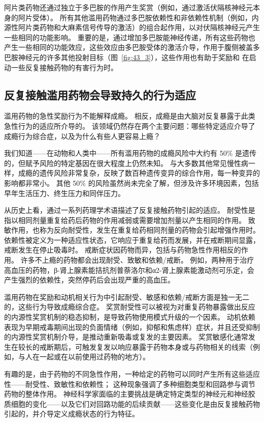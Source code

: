 阿片类药物还通过独立于多巴胺的作用产生奖赏（例如，通过激活伏隔核神经元本身的阿片受体）。
所有其他滥用药物通过多巴胺依赖性和非依赖性机制（例如，内源性阿片类药物和大麻素信号传导的激活）的组合起作用，以对伏隔核神经元产生一些相同的功能影响。
重要的是，通过增加多巴胺能神经传递，所有这些药物也产生一些相同的功能效应，这些效应由多巴胺受体的激活介导，作用于腹侧被盖多巴胺神经元的许多其他投射目标（图~\ref{fig:43_3}），这些作用也有助于奖励和 在启动一些反复接触药物的有害行为时。



\subsection{反复接触滥用药物会导致持久的行为适应}

滥用药物的急性奖励行为不能解释成瘾。
相反，成瘾是由大脑对反复暴露于此类急性行为的适应所介导的。
该领域仍然存在两个主要问题：哪些特定适应介导了成瘾行为综合症，以及为什么有些人更容易上瘾？


我们知道——在动物和人类中——所有滥用药物的成瘾风险中大约有 50\% 是遗传的，但赋予风险的特定基因在很大程度上仍然未知。
与大多数其他常见慢性病一样，成瘾的遗传风险非常复杂，反映了数百种遗传变异的综合作用，每一种变异的影响都非常小。
其他 50\% 的风险虽然尚未完全了解，但涉及许多环境因素，包括早年生活压力、终生压力和同伴压力。


从历史上看，通过一系列药理学术语描述了反复接触药物引起的适应。
耐受性是指以相同剂量重复给药后药物的作用减弱或需要增加剂量以产生相同的作用。
致敏作用，也称为反向耐受性，发生在重复给药相同剂量的药物会引起增强作用时。
依赖性被定义为一种适应性状态，它响应于重复给药而发展，并在戒断期间显露，戒断发生在停止吸毒时。
戒断症状因药物而异，包括与药物急性作用相反的作用。
许多不上瘾的药物都会出现耐受、致敏和依赖/戒断。
例如，两种用于治疗高血压的药物，β-肾上腺素能拮抗剂普萘洛尔和α2-肾上腺素能激动剂可乐定，会产生强烈的依赖性，突然停药后会出现严重的高血压。


滥用药物在奖励和动机相关行为中引起耐受、敏感和依赖/戒断方面是独一无二的，这些行为导致成瘾综合症。
奖赏耐受性可以被视为对重复药物暴露做出反应的内源性奖赏机制的稳态抑制，是导致药物使用模式升级的一个因素。
动机依赖表现为早期戒毒期间出现的负面情绪（例如，抑郁和焦虑样）症状，并且还受抑制的内源性奖赏机制介导，是推动重新吸毒或复发的主要因素。
奖赏敏感化通常发生在较长的戒断期后，可触发复发以响应暴露于药物本身或与药物相关的线索（例如，与人在一起或在以前使用过药物的地方）。


有趣的是，由于药物的不同急性作用，一种给定的药物可以同时产生所有这些适应性——耐受性、致敏性和依赖性； 
这种现象强调了多种细胞类型和回路参与调节药物的整体作用。
神经科学家面临的主要挑战是确定特定类型的神经元和神经胶质细胞的变化——以及它们对回路功能的后续贡献——这些变化是由反复接触药物引起的，并介导定义成瘾状态的行为特征。



